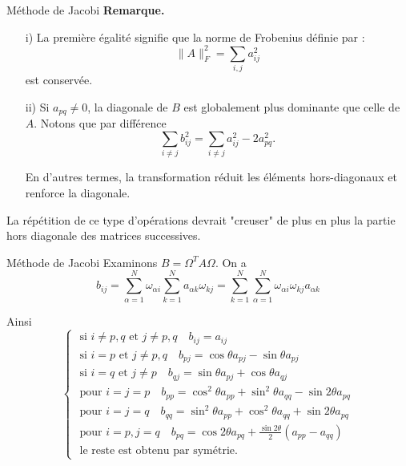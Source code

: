 \documentclass[french, 10pt]{beamer}
\theoremstyle{definition}
\begin{document}
\begin{frame}{Méthode de Jacobi}	
	\textbf{Remarque.}
	\begin{itemize}
		\item[i)]La première égalité signifie que la norme de Frobenius définie par :
		$$\|A\|_F^2 = \sum_{i, j} a_{i j}^2$$ est conservée.
		\item[ii)]Si $a_{p q} \neq 0$, la diagonale de $B$ est globalement plus dominante que celle de $A$. Notons que par différence
		$$
		\sum_{i \neq j} b_{i j}^2=\sum_{i \neq j} a_{i j}^2-2 a_{p q}^2.$$
		
		En d'autres termes, la transformation réduit les éléments hors-diagonaux et renforce la diagonale.
	\end{itemize}
	La répétition de ce type d'opérations devrait "creuser" de plus en plus la partie hors diagonale des matrices successives.
	
\end{frame}
\begin{frame}{Méthode de Jacobi}
	Examinons $B=\Omega^T A \Omega$. On a
	$$
	b_{i j}=\sum_{\alpha=1}^N \omega_{\alpha i} \sum_{k=1}^N a_{\alpha k} \omega_{k j}=\sum_{k=1}^N \sum_{\alpha=1}^N \omega_{\alpha i} \omega_{k j} a_{\alpha k}
	$$
	
	Ainsi
	$$
	\left\{\begin{array}{c}
	\text { si } i \neq p, q \text { et } j \neq p, q \quad b_{i j}=a_{i j} \\
	\text { si } i=p \text { et } j \neq p, q \quad b_{p j}=\cos \theta a_{p j}-\sin \theta a_{p j} \\
	\text { si } i=q \text { et } j \neq p \quad b_{q j}=\sin \theta a_{p j}+\cos \theta a_{q j} \\
	\text { pour } i=j=p \quad b_{p p}=\cos ^2 \theta a_{p p}+\sin ^2 \theta a_{q q}-\sin 2 \theta a_{p q} \\
	\text { pour } i=j=q \quad b_{q q}=\sin ^2 \theta a_{p p}+\cos ^2 \theta a_{q q}+\sin 2 \theta a_{p q} \\
	\text { pour } i=p, j=q \quad b_{p q}=\cos 2 \theta a_{p q}+\frac{\sin 2 \theta}{2}\left(a_{p p}-a_{q q}\right) \\
	\text { le reste est obtenu par symétrie. }
	\end{array}\right.
	$$	
	
	
	
\end{frame}
\end{document}
